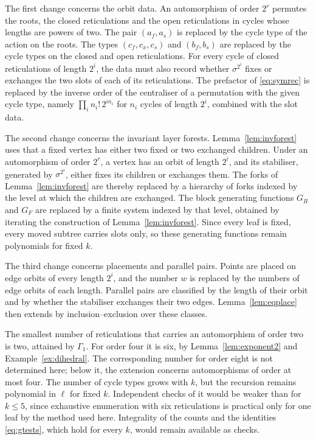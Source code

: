 \documentclass[11pt,a4paper]{article}
\theoremstyle{definition}
\begin{document}
The first change concerns the orbit data. An automorphism of order $2^r$ permutes the roots, the closed reticulations and the open reticulations in cycles whose lengths are powers of two. The pair $(a_f,a_s)$ is replaced by the cycle type of the action on the roots. The types $(c_f,c_x,c_s)$ and $(b_f,b_s)$ are replaced by the cycle types on the closed and open reticulations. For every cycle of closed reticulations of length $2^i$, the data must also record whether $\sigma^{2^i}$ fixes or exchanges the two slots of each of its reticulations. The prefactor of \eqref{eq:symrec} is replaced by the inverse order of the centraliser of a permutation with the given cycle type, namely $\prod_i n_i!\,2^{in_i}$ for $n_i$ cycles of length $2^i$, combined with the slot data.

The second change concerns the invariant layer forests. Lemma~\ref{lem:invforest} uses that a fixed vertex has either two fixed or two exchanged children. Under an automorphism of order $2^r$, a vertex has an orbit of length $2^i$, and its stabiliser, generated by $\sigma^{2^i}$, either fixes its children or exchanges them. The forks of Lemma~\ref{lem:invforest} are thereby replaced by a hierarchy of forks indexed by the level at which the children are exchanged. The block generating functions $G_R$ and $G_F$ are replaced by a finite system indexed by that level, obtained by iterating the construction of Lemma~\ref{lem:invforest}. Since every leaf is fixed, every moved subtree carries slots only, so these generating functions remain polynomials for fixed $k$.

The third change concerns placements and parallel pairs. Points are placed on edge orbits of every length $2^i$, and the number $w$ is replaced by the numbers of edge orbits of each length. Parallel pairs are classified by the length of their orbit and by whether the stabiliser exchanges their two edges. Lemma~\ref{lem:eqplace} then extends by inclusion--exclusion over these classes.

The smallest number of reticulations that carries an automorphism of order two is two, attained by $\Gamma_1$. For order four it is six, by Lemma~\ref{lem:exponent2} and Example~\ref{ex:dihedral}. The corresponding number for order eight is not determined here; below it, the extension concerns automorphisms of order at most four. The number of cycle types grows with $k$, but the recursion remains polynomial in $\ell$ for fixed $k$. Independent checks of it would be weaker than for $k\le5$, since exhaustive enumeration with six reticulations is practical only for one leaf by the method used here. Integrality of the counts and the identities \eqref{eq:gtests}, which hold for every $k$, would remain available as checks.
\end{document}
